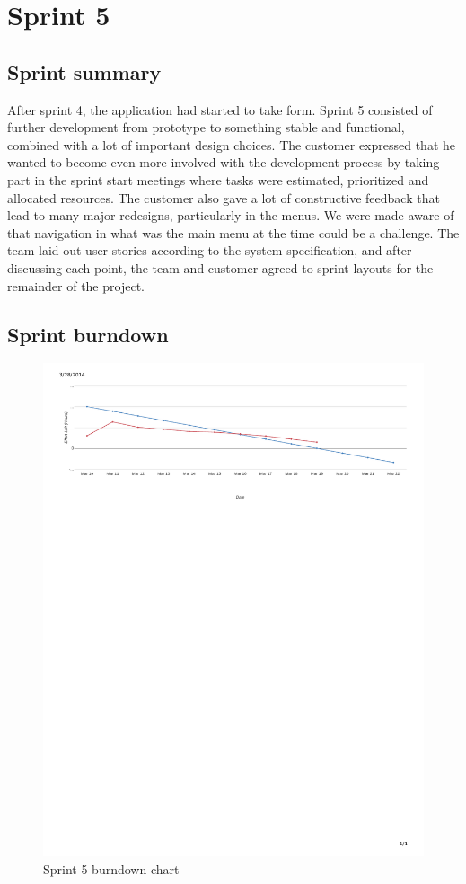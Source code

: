 \section{Sprint 5}
\subsection{Sprint summary}
After sprint 4, the application had started to take form. Sprint 5 consisted of further development from prototype to something stable and functional, combined with a lot of important design choices. The customer expressed that he wanted to become even more involved with the development process by taking part in the sprint start meetings where tasks were estimated, prioritized and allocated resources. The customer also gave a lot of constructive feedback that lead to many major redesigns, particularly in the menus. We were made aware of that navigation in what was the main menu at the time could be a challenge. The team laid out user stories according to the system specification, and after discussing each point, the team and customer agreed to sprint layouts for the remainder of the project.
	
\subsection{Sprint burndown}



\begin{figure}[H]
\includegraphics[width=\textwidth, trim= 1cm 21cm 1cm 1cm, clip=true]{ch/projectManagement/fig/burndown4.pdf}
\caption{Sprint 5 burndown chart}
\label{fig:sprint5burndown}
\end{figure}

